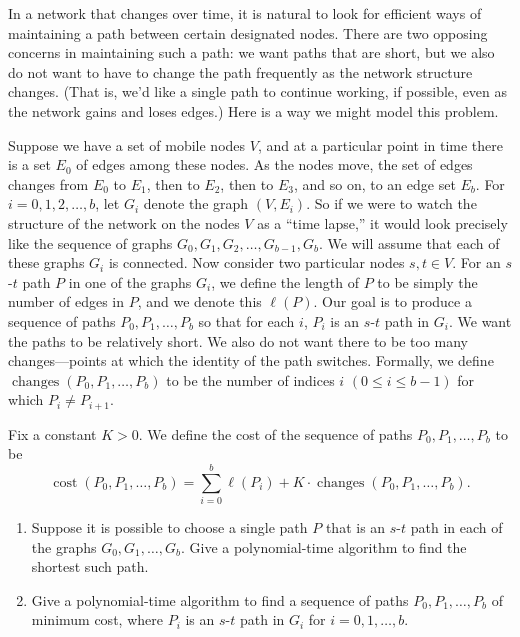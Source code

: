 \documentclass[12pt,a4paper]{article}
\begin{document}
In a network that changes over time, it is natural to look for efficient ways of maintaining a path between certain designated nodes. There are two opposing concerns in maintaining such a path: we want paths that are short, but we also do not want to have to change the path frequently as the network structure changes. (That is, we'd like a single path to continue working, if possible, even as the network gains and loses edges.) Here is a way we might model this problem.

Suppose we have a set of mobile nodes $V$, and at a particular point in time there is a set $E_0$ of edges among these nodes. As the nodes move, the set of edges changes from $E_0$ to $E_1$, then to $E_2$, then to $E_3$, and so on, to an edge set $E_b$. For $i=0,1,2,\ldots,b$, let $G_i$ denote the graph $(V,E_i)$. So if we were to watch the structure of the network on the nodes $V$ as a ``time lapse,'' it would look precisely like the sequence of graphs $G_0,G_1,G_2,\ldots,G_{b-1},G_b$. We will assume that each of these graphs $G_i$ is connected. Now consider two particular nodes $s,t\in V$. For an $s$-$t$ path $P$ in one of the graphs $G_i$, we define the length of $P$ to be simply the number of edges in $P$, and we denote this $\ell(P)$. Our goal is to produce a sequence of paths $P_0,P_1,\ldots,P_b$ so that for each $i$, $P_i$ is an $s$-$t$ path in $G_i$. We want the paths to be relatively short. We also do not want there to be too many changes---points at which the identity of the path switches. Formally, we define $\operatorname{changes}(P_0,P_1,\ldots,P_b)$ to be the number of indices $i$ $(0\le i\le b-1)$ for which $P_i\ne P_{i+1}$.

Fix a constant $K>0$. We define the cost of the sequence of paths $P_0,P_1,\ldots,P_b$ to be
\[
\operatorname{cost}(P_0,P_1,\ldots,P_b)
=\sum_{i=0}^{b}\ell(P_i)+K\cdot \operatorname{changes}(P_0,P_1,\ldots,P_b).
\]

\begin{enumerate}[label=(\alph*), leftmargin=2em]
\item Suppose it is possible to choose a single path $P$ that is an $s$-$t$ path in each of the graphs $G_0,G_1,\ldots,G_b$. Give a polynomial-time algorithm to find the shortest such path.

\item Give a polynomial-time algorithm to find a sequence of paths $P_0,P_1,\ldots,P_b$ of minimum cost, where $P_i$ is an $s$-$t$ path in $G_i$ for $i=0,1,\ldots,b$.
\end{enumerate}
\end{document}
